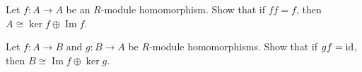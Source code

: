 \documentclass{problemset}
\DeclareMathOperator{\im}{Im}
\begin{document}
\begin{exercise} 
\end{exercise}


\begin{exercise} 
\end{exercise}


\begin{exercise} 
Let \(f: A \to A\) be an \(R\)-module homomorphism.  Show that if \(ff=f\), then \(A \cong \ker f \oplus \im f\).
\end{exercise}


\begin{exercise} Let \(f: A \to B\) and \(g: B \to A\) be \(R\)-module homomorphisms.  Show that if \(gf={\rm id}\), then \(B \cong \im f \oplus \ker g\).
\end{exercise}


\begin{exercise} 
\end{exercise}



\end{document}
